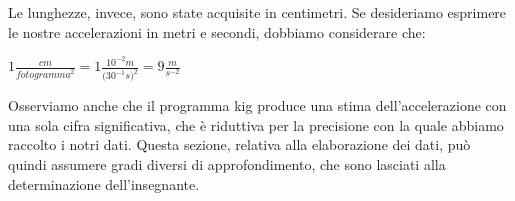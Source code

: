 Le lunghezze, invece, sono state acquisite in centimetri. Se desideriamo esprimere le nostre accelerazioni in metri e secondi, dobbiamo considerare che:
\begin{center}
\begin{math}
1 \frac{cm}{{fotogramma}^2}=1 \frac{10^{-2}m}{{(30^{-1}}s)^2} = 9 \frac{m}{s^{-2}}
\end{math}
\end{center}

Osserviamo anche che il programma kig produce una stima dell'accelerazione con una sola cifra significativa, che è riduttiva per la precisione con la quale abbiamo raccolto i notri dati. Questa sezione, relativa alla elaborazione dei dati, può quindi assumere gradi diversi di approfondimento, che sono lasciati alla determinazione dell'insegnante.
